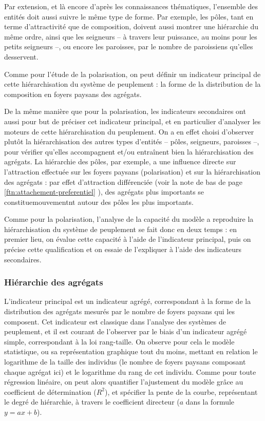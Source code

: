 Par extension, et là encore d'après les connaissances thématiques, l'ensemble des entités doit aussi suivre le même type de forme.
Par exemple, les pôles, tant en terme d'attractivité que de composition, doivent aussi montrer une hiérarchie du même ordre, ainsi que les seigneurs -- à travers leur puissance, au moins pour les petits seigneurs --, ou encore les paroisses, par le nombre de paroissiens qu'elles desservent.

Comme pour l'étude de la polarisation, on peut définir un indicateur principal de cette hiérarchisation du système de peuplement :
la forme de la distribution de la composition en foyers paysans des agrégats.

De la même manière que pour la polarisation, les indicateurs secondaires ont aussi pour but de préciser cet indicateur principal, et en particulier d'analyser les moteurs de cette hiérarchisation du peuplement.
On a en effet choisi d'observer plutôt la hiérarchisation des autres types d'entités -- pôles, seigneurs, paroisses --, pour vérifier qu'elles accompagnent et/ou entraînent bien la hiérarchisation des agrégats.
La hiérarchie des pôles, par exemple, a une influence directe sur l'attraction effectuée sur les foyers paysans (polarisation) et sur la hiérarchisation des agrégats :
par effet d'attraction différenciée (voir la note de bas de page \ref{ftn:attachement-preferentiel} ), des agrégats plus importants se constituemouvementnt autour des pôles les plus importants.

Comme pour la polarisation, l'analyse de la capacité du modèle a reproduire la hiérarchisation du système de peuplement se fait donc en deux temps :
en premier lieu, on évalue cette capacité à l'aide de l'indicateur principal, puis on précise cette qualification et on essaie de l'expliquer à l'aide des indicateurs secondaires.


\subsubsection{Hiérarchie des agrégats}

L'indicateur principal est un indicateur agrégé, correspondant à la forme de la distribution des agrégats mesurés par le nombre de foyers paysans qui les composent.
Cet indicateur est classique dans l'analyse des systèmes de peuplement, et il est courant de l'observer par le biais d'un indicateur agrégé simple, correspondant à la loi rang-taille.
On observe pour cela le modèle statistique, ou sa représentation graphique tout du moins, mettant en relation le logarithme de la taille des individus (le nombre de foyers paysans composant chaque agrégat ici) et le logarithme du rang de cet individu.
Comme pour toute régression linéaire, on peut alors quantifier l'ajustement du modèle grâce au coefficient de détermination ($R^2$), et spécifier la pente de la courbe, représentant le degré de hiérarchie, à travers le coefficient directeur ($a$ dans la formule $y = ax + b$).


